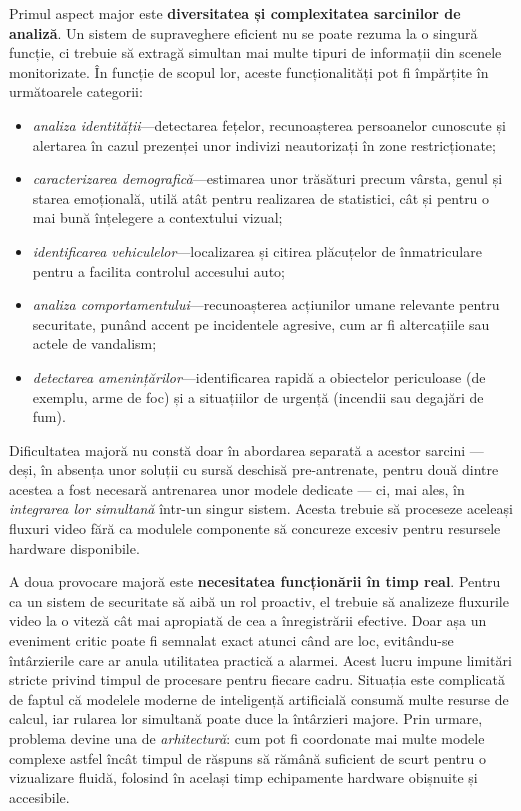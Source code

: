 \documentclass[../../main.tex]{subfiles}
\begin{document}
Primul aspect major este \textbf{diversitatea și complexitatea sarcinilor de analiză}. Un sistem de supraveghere eficient nu se poate rezuma la o singură funcție, ci trebuie să extragă simultan mai multe tipuri de informații din scenele monitorizate. În funcție de scopul lor, aceste funcționalități pot fi împărțite în următoarele categorii:
\begin{itemize}
	\item \emph{analiza identității}---detectarea fețelor, recunoașterea persoanelor cunoscute și alertarea în cazul prezenței unor indivizi neautorizați în zone \linebreak restricționate; 
	\item \emph{caracterizarea demografică}---estimarea unor trăsături precum vârsta, genul și starea emoțională, utilă atât pentru realizarea de statistici, cât și pentru o mai bună înțelegere a contextului vizual; 
	\item \emph{identificarea vehiculelor}---localizarea și citirea plăcuțelor de înmatriculare pentru a facilita controlul accesului auto; 
	\item \emph{analiza comportamentului}---recunoașterea acțiunilor umane relevante pentru securitate, punând accent pe incidentele agresive, cum ar fi altercațiile sau actele de vandalism; 
	\item \emph{detectarea amenințărilor}---identificarea rapidă a obiectelor periculoase (de exemplu, arme de foc) și a situațiilor de urgență (incendii sau degajări de fum).
	
\end{itemize} 

Dificultatea majoră nu constă doar în abordarea separată a acestor sarcini — deși, în absența unor soluții cu sursă deschisă pre-antrenate, pentru două dintre acestea a fost necesară antrenarea unor modele dedicate — ci, mai ales, în \emph{integrarea lor simultană} într-un singur sistem. Acesta trebuie să proceseze aceleași fluxuri video fără ca modulele componente să concureze excesiv pentru resursele hardware disponibile.

A doua provocare majoră este \textbf{necesitatea funcționării în timp real}. Pentru ca un sistem de securitate să aibă un rol proactiv, el trebuie să analizeze fluxurile video la o viteză cât mai apropiată de cea a înregistrării efective. Doar așa un eveniment critic poate fi semnalat exact atunci când are loc, evitându-se întârzierile care ar anula utilitatea practică a alarmei. Acest lucru impune limitări stricte privind timpul de procesare pentru fiecare cadru. Situația este complicată de faptul că modelele moderne de inteligență artificială consumă multe resurse de calcul, iar rularea lor simultană poate duce la întârzieri majore. Prin urmare, problema devine una de \emph{arhitectură}: cum pot fi coordonate mai multe modele complexe astfel încât timpul de răspuns să rămână suficient de scurt pentru o vizualizare fluidă, folosind în același timp echipamente hardware obișnuite și accesibile.
\end{document}
